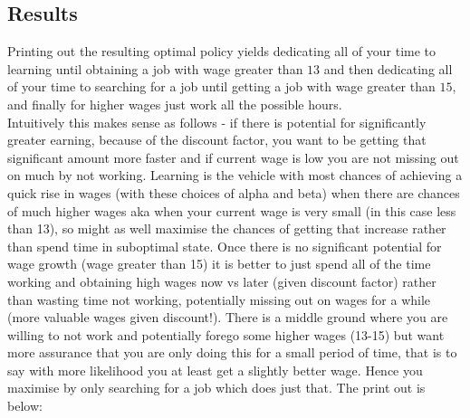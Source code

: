 \documentclass{article}[12pt]
\begin{document}
\subsection{Results}
Printing out the resulting optimal policy yields dedicating all of your time to learning until obtaining a job with wage greater than $13$ and then dedicating all of your time to searching for a job until getting a job with wage greater than $15$, and finally for higher wages just work all the possible hours.\\

Intuitively this makes sense as follows - if there is potential for significantly greater earning, because of the discount factor, you want to be getting that significant amount more faster and if current wage is low you are not missing out on much by not working. Learning is the vehicle with most chances of achieving a quick rise in wages (with these choices of alpha and beta) when there are chances of much higher wages aka when your current wage is very small (in this case less than 13), so might as well maximise the chances of getting that increase rather than spend time in suboptimal state. Once there is no significant potential for wage growth (wage greater than 15) it is better to just spend all of the time working and obtaining high wages now vs later (given discount factor) rather than wasting time not working, potentially missing out on wages for a while (more valuable wages given discount!). There is a middle ground where you are willing to not work and potentially forego some higher wages (13-15) but want more assurance that you are only doing this for a small period of time, that is to say with more likelihood you at least get a slightly better wage. Hence you maximise by only searching for a job which does just that. The print out is below:
\end{document}
